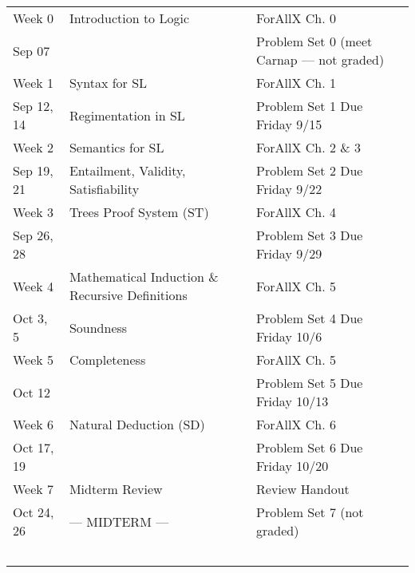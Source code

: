 \documentclass[letterpaper]{inzane_syllabus} %
\begin{document}
\begin{center}
\begin{tabularx}{\textwidth}{p{2.5cm}p{8cm}p{9cm}} %
\arrayrulecolor{myCOLOR}\hline
\multicolumn{3}{l}{\textbf{\textcolor{myCOLOR}{\large Part 1: Sentential Logic}}} \\
\hline

Week 0 & Introduction to Logic & ForAllX Ch. 0 \\
Sep 07 & & Problem Set 0 (meet Carnap --- not graded)\\
\arrayrulecolor{maingray}\hline

Week 1 & Syntax for SL & ForAllX Ch. 1\\
Sep 12, 14 & Regimentation in SL & Problem Set 1 Due Friday 9/15  \\
\arrayrulecolor{maingray}\hline

  Week 2 & Semantics for SL & ForAllX Ch. 2 \& 3 \\
Sep 19, 21 & Entailment, Validity, Satisfiability & Problem Set 2 Due Friday 9/22 \\
\arrayrulecolor{maingray}\hline

Week 3 & Trees Proof System (ST) & ForAllX Ch. 4 \\
Sep 26, 28 & & Problem Set 3 Due Friday 9/29 \\
\arrayrulecolor{maingray}\hline

Week 4 & Mathematical Induction \& Recursive Definitions & ForAllX Ch. 5 \\
Oct 3, 5 & Soundness & Problem Set 4 Due Friday 10/6\\
\arrayrulecolor{maingray}\hline

Week 5 & Completeness & ForAllX Ch. 5 \\
Oct 12 &  & Problem Set 5 Due Friday 10/13 \\
\arrayrulecolor{maingray}\hline

Week 6 & Natural Deduction (SD) & ForAllX Ch. 6 \\
Oct 17, 19 & &  Problem Set 6 Due Friday 10/20\\
\arrayrulecolor{myCOLOR}\hline

Week 7 & Midterm Review & Review Handout \\
Oct 24, 26 & --- MIDTERM --- &  Problem Set 7 (not graded) \\
~\\


\end{tabularx}
\end{center}
\end{document}
